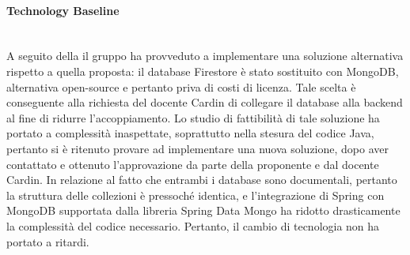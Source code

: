 \paragraph{Technology Baseline} \mbox{}\\
A seguito della \RP{} il gruppo ha provveduto a implementare una soluzione alternativa rispetto a quella proposta: il database Firestore è stato sostituito con MongoDB, alternativa open-source e pertanto priva di costi di licenza. Tale scelta è conseguente alla richiesta del docente Cardin di collegare il {database} alla backend al fine di ridurre l'accoppiamento. Lo studio di fattibilità di tale soluzione ha portato a complessità inaspettate, soprattutto nella stesura del codice Java, pertanto si è ritenuto provare ad implementare una nuova soluzione, dopo aver contattato e ottenuto l'approvazione da parte della proponente e dal docente Cardin. In relazione al fatto che entrambi i database sono documentali, pertanto la struttura delle collezioni è pressoché identica, e l'integrazione di Spring con MongoDB supportata dalla libreria Spring Data Mongo ha ridotto drasticamente la complessità del codice necessario. Pertanto, il cambio di tecnologia non ha portato a ritardi.